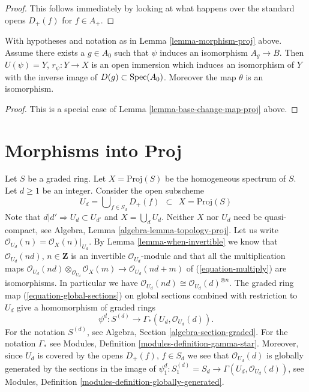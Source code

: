 \begin{proof}
This follows immediately by looking at what happens over the standard
opens $D_{+}(f)$ for $f \in A_{+}$.
\end{proof}

\begin{lemma}
\label{lemma-localization-map-proj}
With hypotheses and notation as in Lemma \ref{lemma-morphism-proj} above.
Assume there exists a $g \in A_0$ such that $\psi$ induces an
isomorphism $A_g \to B$. Then
$U(\psi) = Y$, $r_\psi : Y \to X$ is an open immersion
which induces an isomorphism of $Y$ with the inverse image
of $D(g) \subset \mathop{\rm Spec}(A_0)$. Moreover the map $\theta$
is an isomorphism.
\end{lemma}

\begin{proof}
This is a special case of Lemma \ref{lemma-base-change-map-proj} above.
\end{proof}











\section{Morphisms into Proj}
\label{section-morphisms-proj}

\noindent
Let $S$ be a graded ring.
Let $X = \text{Proj}(S)$ be the homogeneous spectrum of $S$.
Let $d \geq 1$ be an integer.
Consider the open subscheme
\begin{equation}
\label{equation-Ud}
U_d = \bigcup\nolimits_{f  \in S_d} D_{+}(f)
\ \ \subset\ \ 
X = \text{Proj}(S)
\end{equation}
Note that $d | d' \Rightarrow U_d \subset U_{d'}$ and
$X = \bigcup_d U_d$. Neither $X$ nor $U_d$ need
be quasi-compact, see Algebra, Lemma \ref{algebra-lemma-topology-proj}.
Let us write $\mathcal{O}_{U_d}(n) = \mathcal{O}_X(n)|_{U_d}$.
By Lemma \ref{lemma-when-invertible}
we know that $\mathcal{O}_{U_d}(nd)$, $n \in \mathbf{Z}$
is an invertible $\mathcal{O}_{U_d}$-module and
that all the multiplication maps
$\mathcal{O}_{U_d}(nd) \otimes_{\mathcal{O}_{U_d}} \mathcal{O}_X(m)
\to \mathcal{O}_{U_d}(nd + m)$ of
(\ref{equation-multiply}) are isomorphisms. In particular we have
$\mathcal{O}_{U_d}(nd) \cong \mathcal{O}_{U_d}(d)^{\otimes n}$.
The graded ring map (\ref{equation-global-sections}) on global sections
combined with restriction to $U_d$ give a homomorphism of graded rings
\begin{equation}
\label{equation-psi-d}
\psi^d : S^{(d)} \longrightarrow \Gamma_*(U_d, \mathcal{O}_{U_d}(d)).
\end{equation}
For the notation $S^{(d)}$, see Algebra, Section \ref{algebra-section-graded}.
For the notation $\Gamma_*$ see
Modules, Definition \ref{modules-definition-gamma-star}.
Moreover, since $U_d$ is covered by the opens $D_{+}(f)$, $f \in S_d$
we see that $\mathcal{O}_{U_d}(d)$ is globally generated
by the sections in the image of
$\psi^d_1 : S^{(d)}_1 = S_d \to \Gamma(U_d, \mathcal{O}_{U_d}(d))$, see
Modules, Definition \ref{modules-definition-globally-generated}.

